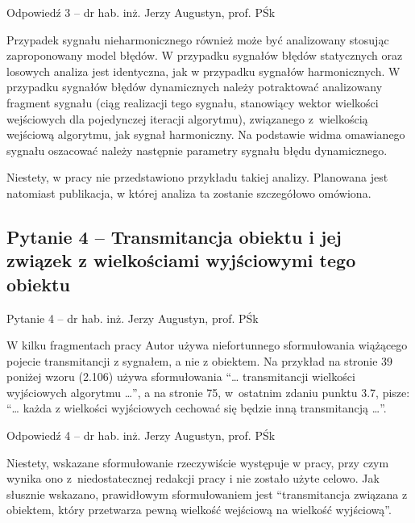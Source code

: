 \documentclass[12pt, polish, aspectratio = 169]{slides}
\begin{document}
\begin{frame}[allowframebreaks]{Odpowiedź 3 -- dr hab. inż. Jerzy Augustyn, prof. PŚk}\small
\begin{justify}
Przypadek sygnału nieharmonicznego również może być analizowany stosując zaproponowany model błędów. W przypadku sygnałów błędów statycznych oraz losowych analiza jest identyczna, jak w przypadku sygnałów harmonicznych. W przypadku sygnałów błędów dynamicznych należy potraktować analizowany fragment sygnału (ciąg realizacji tego sygnału, stanowiący wektor wielkości wejściowych dla pojedynczej iteracji algorytmu), związanego z wielkością wejściową algorytmu, jak sygnał harmoniczny. Na podstawie widma omawianego sygnału oszacować należy następnie parametry sygnału błędu dynamicznego.

Niestety, w pracy nie przedstawiono przykładu takiej analizy. Planowana jest natomiast publikacja, w której analiza ta zostanie szczegółowo omówiona.
\end{justify}
\end{frame}

\subsection{Pytanie 4 -- Transmitancja obiektu i jej związek z wielkościami wyjściowymi tego obiektu}

\begin{frame}{Pytanie 4 -- dr hab. inż. Jerzy Augustyn, prof. PŚk}\large
\begin{justify}
W kilku fragmentach pracy Autor używa niefortunnego sformułowania wiążącego pojecie transmitancji z sygnałem, a nie z obiektem. Na przykład na stronie 39 poniżej wzoru (2.106) używa sformułowania \enquote{\dots{} transmitancji wielkości wyjściowych algorytmu \dots}, a na stronie 75, w ostatnim zdaniu punktu 3.7, pisze: \enquote{\dots{} każda z wielkości wyjściowych cechować się będzie inną transmitancją \dots}.
\end{justify}
\end{frame}

\begin{frame}[allowframebreaks]{Odpowiedź 4 -- dr hab. inż. Jerzy Augustyn, prof. PŚk}\small
\begin{justify}
Niestety, wskazane sformułowanie rzeczywiście występuje w pracy, przy czym wynika ono z niedostatecznej redakcji pracy i nie zostało użyte celowo. Jak słusznie wskazano, prawidłowym sformułowaniem jest \enquote{transmitancja związana z obiektem, który przetwarza pewną wielkość wejściową na wielkość wyjściową}.
\end{justify}
\end{frame}
\end{document}
